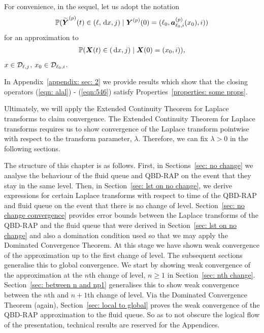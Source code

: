 For convenience, in the sequel, let us adopt the notation 
\begin{align}
	\mathbb P(\widetilde{\boldsymbol Y}^{(p)}(t) \in (\ell,\, \mathrm{d} x, j)\mid \boldsymbol Y^{(p)}(0)=(\ell_0, \boldsymbol  a_{\ell_0,i}^{(p)}(x_0),  i) )
\end{align}
for an approximation to 
\begin{align}
	\mathbb P(\boldsymbol X(t)\in(\, \mathrm{d} x, j)\mid \boldsymbol X(0)=(x_0, i)),
\end{align}
\(x\in \mathcal{D}_{\ell,j}\), \(x_0\in\mathcal{D}_{\ell_0,i}\).

In Appendix~\ref{appendix: sec: 2} we provide results which show that the closing operators (\ref{eqn: alal}) - (\ref{eqn:546}) satisfy Properties~\ref{properties: some props}. 

Ultimately, we will apply the Extended Continuity Theorem for Laplace transforms \cite[Chapter XIII, Theorem 2a]{feller1957} to claim convergence. The Extended Continuity Theorem for Laplace transforms requires us to show convergence of the Laplace transform pointwise with respect to the transform parameter, \(\lambda\). Therefore, we can fix \(\lambda>0\) in the following sections. 

The structure of this chapter is as follows. First, in Sections~\ref{sec: no change} we analyse the behaviour of the fluid queue and QBD-RAP on the event that they stay in the same level. Then, in Section~\ref{sec: lst on no change}, we derive expressions for certain Laplace transforms with respect to time of the QBD-RAP and fluid queue on the event that there is no change of level. Section~\ref{sec: no change convergence} provides error bounds between the Laplace transforms of the QBD-RAP and the fluid queue that were derived in Section~\ref{sec: lst on no change} and also a domination condition used so that we may apply the Dominated Convergence Theorem. At this stage we have shown weak convergence of the approximation up to the first change of level. The subsequent sections generalise this to global convergence. We start by showing weak convergence of the approximation at the \(n\)th change of level, \(n\geq 1\) in Section~\ref{sec: nth change}. Section~\ref{sec: between n and np1} generalises this to show weak convergence between the \(n\)th and \(n+1\)th change of level. Via the Dominated Convergence Theorem (again), Section~\ref{sec: local to global} proves the weak convergence of the QBD-RAP approximation to the fluid queue. So as to not obscure the logical flow of the presentation, technical results are reserved for the Appendices.

